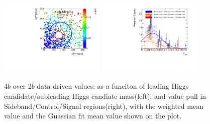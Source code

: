 \begin{figure}[htbp!]
\begin{center}
\includegraphics[angle=270, width=0.45\textwidth]{./figures/boosted/AppendixMuqcdstudy/FourTag_Incl_mH0H1.pdf}
\includegraphics[angle=270, width=0.45\textwidth]{./figures/boosted/AppendixMuqcdstudy/FourTag_Incl_mH0H1_pull.pdf}
\caption{4$b$ over 2$b$ data driven \muqcd values: \muqcd as a funciton of leading Higgs candidate/subleading Higgs candiate mass(left); and \muqcd value pull in Sideband/Control/Signal regions(right), with the weighted mean value and the Guassian fit mean value shown on the plot.}
\label{fig:app-muqcd-4b}
\end{center}
\end{figure}



